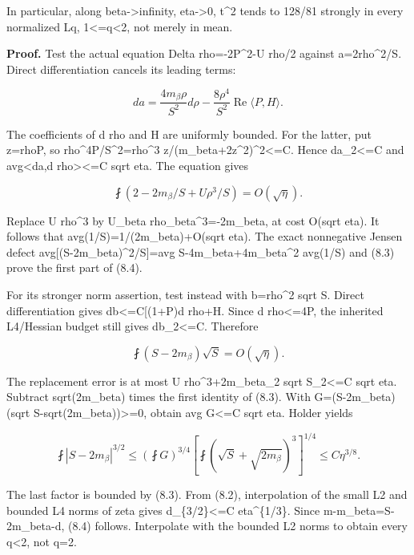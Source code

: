 \documentclass[
  10pt,
]{article}
\begin{document}
In particular, along beta-\textgreater infinity, eta-\textgreater0,
\textbar t\textbar\^{}2 tends to 128/81 strongly in every normalized Lq,
1\textless=q\textless2, not merely in mean.

\textbf{Proof.} Test the actual equation Delta
rho=-2\textbar P\textbar\^{}2-U rho/2 against a=2rho\^{}2/S. Direct
differentiation cancels its leading terms:

\[
 da=\frac{4m_\beta\rho}{S^2}d\rho
       -\frac{8\rho^4}{S^2}\operatorname{Re}\langle P,H\rangle.
\]

The coefficients of d rho and H are uniformly bounded. For the latter,
put z=rho\textbar P\textbar, so
rho\^{}4\textbar P\textbar/S\^{}2=rho\^{}3
z/(m\_beta+2z\^{}2)\^{}2\textless=C. Hence
\textbar\textbar da\textbar\textbar\_2\textless=C and
\textbar avg\textless da,d rho\textgreater\textbar\textless=C sqrt eta.
The equation gives

\[
 \fint(2-2m_\beta/S+U\rho^3/S)=O(\sqrt\eta).
\]

Replace U rho\^{}3 by U\_beta rho\_beta\^{}3=-2m\_beta, at cost O(sqrt
eta). It follows that avg(1/S)=1/(2m\_beta)+O(sqrt eta). The exact
nonnegative Jensen defect avg{[}(S-2m\_beta)\^{}2/S{]}=avg
S-4m\_beta+4m\_beta\^{}2 avg(1/S) and (8.3) prove the first part of
(8.4).

For its stronger norm assertion, test instead with b=rho\^{}2 sqrt S.
Direct differentiation gives
\textbar db\textbar\textless=C{[}(1+\textbar P\textbar)\textbar d
rho\textbar+\textbar H\textbar{]}. Since \textbar d
rho\textbar\textless=4\textbar P\textbar, the inherited L4/Hessian
budget still gives \textbar\textbar db\textbar\textbar\_2\textless=C.
Therefore

\[
 \fint(S-2m_\beta)\sqrt S=O(\sqrt\eta).
\]

The replacement error is at most \textbar\textbar U
rho\^{}3+2m\_beta\textbar\textbar\_2 \textbar\textbar sqrt
S\textbar\textbar\_2\textless=C sqrt eta. Subtract sqrt(2m\_beta) times
the first identity of (8.3). With G=(S-2m\_beta)(sqrt
S-sqrt(2m\_beta))\textgreater=0, obtain avg G\textless=C sqrt eta.
Holder yields

\[
 \fint|S-2m_\beta|^{3/2}
 \le(\fint G)^{3/4}
       [\fint(\sqrt S+\sqrt{2m_\beta})^3]^{1/4}
 \le C\eta^{3/8}.
\]

The last factor is bounded by (8.3). From (8.2), interpolation of the
small L2 and bounded L4 norms of zeta gives
\textbar\textbar d\textbar\textbar\_\{3/2\}\textless=C eta\^{}\{1/3\}.
Since m-m\_beta=S-2m\_beta-d, (8.4) follows. Interpolate with the
bounded L2 norms to obtain every q\textless2, not q=2.
\end{document}
